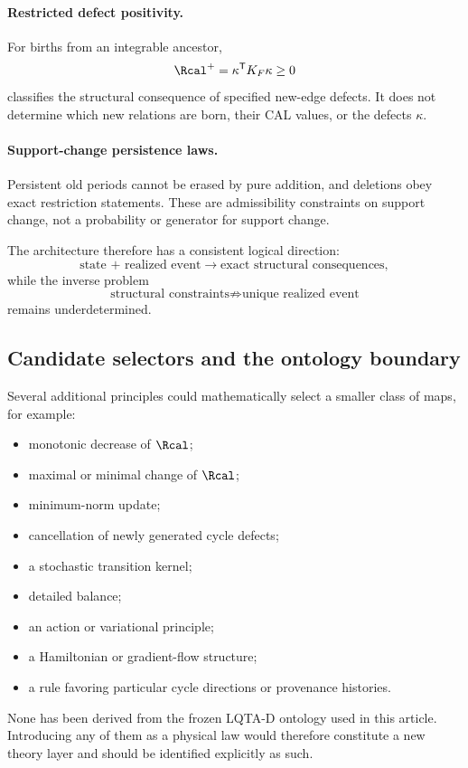 \paragraph*{Restricted defect positivity.}
For births from an integrable ancestor,
\begin{equation}
\Rcal^+=\kappa^{\mathsf T}K_F\kappa\ge0
\end{equation}
classifies the structural consequence of specified new-edge defects. It does not determine which new relations are born, their CAL values, or the defects $\kappa$.

\paragraph*{Support-change persistence laws.}
Persistent old periods cannot be erased by pure addition, and deletions obey exact restriction statements. These are admissibility constraints on support change, not a probability or generator for support change.

The architecture therefore has a consistent logical direction:
\begin{equation}
\boxed{
\text{state + realized event}
\longrightarrow
\text{exact structural consequences},
}
\label{eq:forward-logic}
\end{equation}
while the inverse problem
\begin{equation}
\boxed{
\text{structural constraints}
\not\Longrightarrow
\text{unique realized event}
}
\label{eq:inverse-nogo}
\end{equation}
remains underdetermined.

\subsection{Candidate selectors and the ontology boundary}

Several additional principles could mathematically select a smaller class of maps, for example:
\begin{itemize}
\item monotonic decrease of $\Rcal$;
\item maximal or minimal change of $\Rcal$;
\item minimum-norm update;
\item cancellation of newly generated cycle defects;
\item a stochastic transition kernel;
\item detailed balance;
\item an action or variational principle;
\item a Hamiltonian or gradient-flow structure;
\item a rule favoring particular cycle directions or provenance histories.
\end{itemize}
None has been derived from the frozen LQTA-D ontology used in this article. Introducing any of them as a physical law would therefore constitute a new theory layer and should be identified explicitly as such.

